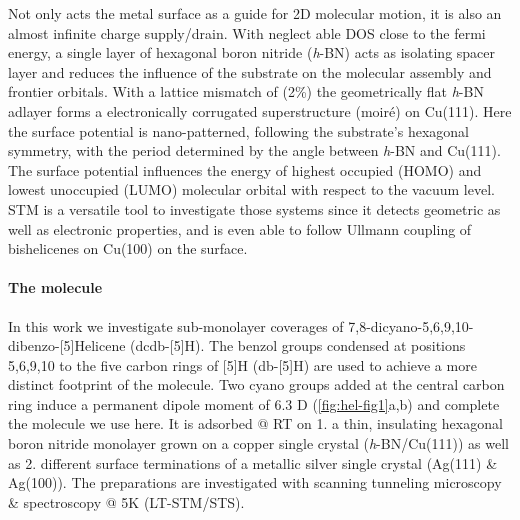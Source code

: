 Not only acts the metal surface as a guide for 2D molecular motion, it is also an almost infinite charge supply/drain. With neglect able DOS close to the fermi energy, a single layer of hexagonal boron nitride (\textit{h}-BN) acts as isolating spacer layer and reduces the influence of the substrate on the molecular assembly and frontier orbitals.\cite{urgel_controlling_2015, Sushobhan_Control_2014, Schulz_Templated_2013} With a lattice mismatch of (2\%)\cite{joshi_boron_2012, preobrajenski_monolayer_2005} the geometrically flat\cite{schwarz_corrugation_2017} \textit{h}-BN adlayer forms a electronically corrugated superstructure (moir\'e) on Cu(111).\cite{joshi_boron_2012} Here the surface potential is nano-patterned\cite{joshi_boron_2012}, following the substrate’s hexagonal symmetry, with the period determined by the angle between \textit{h}-BN and Cu(111)\cite{hermann_periodic_2012}. The surface potential influences the energy of highest occupied (HOMO) and lowest unoccupied (LUMO) molecular orbital with respect to the vacuum level.\cite{Sushobhan_Control_2014, Fernandez_Spectroscopy_2008} STM is a versatile tool to investigate those systems since it detects geometric as well as electronic properties, and is even able to follow Ullmann coupling of bishelicenes on Cu(100)\cite{Waeckerlin_Surface-assisted_2016} on the surface. 

\paragraph{The molecule}

In this work we investigate sub-monolayer coverages of 7,8-dicyano-5,6,9,10-dibenzo-[5]Helicene (dcdb-[5]H). The benzol groups condensed at positions 5,6,9,10 to the five carbon rings of [5]H (db-[5]H) are used to achieve a more distinct footprint of the molecule. Two cyano groups added at the central carbon ring induce a permanent dipole moment of 6.3 D (\autoref{fig:hel-fig1}a,b) and complete the molecule we use here. It is adsorbed @ RT on 1. a thin, insulating hexagonal boron nitride monolayer grown on a copper single crystal (\textit{h}-BN/Cu(111)) as well as 2. different surface terminations of a metallic silver single crystal (Ag(111) \& Ag(100)). The preparations are investigated with scanning tunneling microscopy \& spectroscopy @ 5K (LT-STM/STS).

